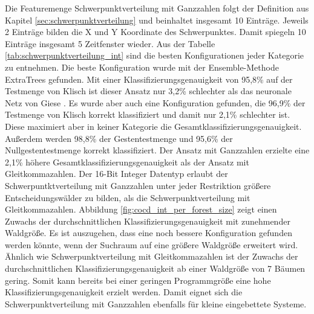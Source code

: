 Die Featuremenge Schwerpunktverteilung mit Ganzzahlen folgt der Definition aus Kapitel \ref{sec:schwerpunktverteilung} und beinhaltet insgesamt 10 Einträge. Jeweils 2 Einträge bilden die X und Y
Koordinate des Schwerpunktes. Damit spiegeln 10 Einträge insgesamt 5 Zeitfenster wieder.
\newline
\newline
Aus der Tabelle \ref{tab:schwerpunktverteilung_int} sind die besten Konfigurationen jeder Kategorie zu entnehmen. Die beste Konfiguration wurde mit der Ensemble-Methode ExtraTrees gefunden.
Mit einer Klassifizierungsgenauigkeit von 95,8\% auf der Testmenge von Klisch ist dieser Ansatz nur 3,2\% schlechter als das neuronale Netz von Giese \cite{gieseThesis}. Es wurde aber auch eine Konfiguration
gefunden, die 96,9\% der Testmenge von Klisch korrekt klassifiziert und damit nur 2,1\% schlechter ist. Diese maximiert aber in keiner Kategorie die Gesamtklassifizierungsgenauigkeit.
Außerdem werden 98,8\% der Gestentestmenge und 95,6\% der Nullgestentestmenge korrekt klassifiziert.
\newline
\newline
Der Ansatz mit Ganzzahlen erzielte eine 2,1\% höhere Gesamtklassifizierungsgenauigkeit als der Ansatz mit Gleitkommazahlen. Der 16-Bit Integer Datentyp erlaubt der Schwerpuntktverteilung mit Ganzzahlen unter jeder
Restriktion größere Entscheidungswälder zu bilden, als die Schwerpunktverteilung mit Gleitkommazahlen. Abbildung \ref{fig:cocd_int_per_forest_size} zeigt einen Zuwachs der durchschnittlichen Klassifizierungsgenauigkeit
mit zunehmender Waldgröße. Es ist auszugehen, dass eine noch bessere Konfiguration gefunden werden könnte, wenn der Suchraum auf eine größere Waldgröße erweitert wird. Ähnlich wie Schwerpunktverteilung mit
Gleitkommazahlen ist der Zuwachs der durchschnittlichen Klassifizierungsgenauigkeit ab einer Waldgröße von 7 Bäumen gering. Somit kann bereits bei einer geringen Programmgröße eine hohe Klassifizierungsgenauigkeit
erzielt werden. Damit eignet sich die Schwerpunktverteilung mit Ganzzahlen ebenfalls für kleine eingebettete Systeme.
